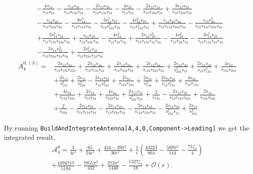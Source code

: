 \begin{align}
  & - \frac{4s_{14}}{s_{13}s_{24}} - \frac{s_{14}s_{23}}{s_{13}s_{134}s_{24}} - \frac{2s_{12}s_{23}}{s_{13}s_{134}s_{24}} - \frac{4s_{23}}{s_{13}s_{24}} - \frac{2s_{12}s_{14}}{s_{13}s_{234}s_{24}} + \frac{3s_{12}s_{23}}{s_{13}s_{234}s_{24}} \nonumber \\
  & - \frac{s_{14}s_{23}}{s_{13}s_{234}s_{24}} - \frac{8s_{14}^2}{s_{13}s_{134}s_{34}} - \frac{3s_{14}^2s_{23}}{s_{13}s_{134}^2s_{34}} - \frac{4s_{14}^2s_{24}}{s_{13}s_{134}^2s_{34}} + \frac{s_{14}s_{23}s_{24}}{s_{13}s_{134}s_{234}s_{34}} - \frac{s_{14}s_{23}^2}{s_{13}s_{134}s_{234}s_{34}} \nonumber \\
  & + \frac{2s_{14}^2s_{23}}{s_{13}s_{134}s_{234}s_{34}} + \frac{s_{14}s_{23}}{s_{13}s_{234}s_{34}} - \frac{4s_{14}^2}{s_{13}s_{24}s_{34}} + \frac{2s_{14}s_{23}^2}{s_{13}s_{134}s_{24}s_{34}} - \frac{4s_{23}^2}{s_{13}s_{24}s_{34}} - \frac{3s_{14}^2s_{23}}{s_{13}s_{134}s_{24}s_{34}} \nonumber \\
  & - \frac{3s_{14}s_{23}^2}{s_{13}s_{234}s_{24}s_{34}} + \frac{2s_{14}^2s_{23}}{s_{13}s_{234}s_{24}s_{34}}
\end{align}
\begin{align}
    A_4^{0,(3)} = {}
          & \frac{2s_{12}s_{34}}{s_{13}s_{134}s_{234}} + \frac{2s_{12}s_{34}}{s_{13}s_{134}s_{24}} + \frac{2s_{12}s_{34}}{s_{13}s_{234}s_{24}} + \frac{2s_{12}s_{34}}{s_{134}s_{234}s_{24}} + \frac{2s_{12}s_{34}}{s_{234}^2s_{24}} + \frac{2s_{12}s_{34}}{s_{13}s_{134}^2} + \frac{4s_{12}}{s_{134}s_{234}} \nonumber \\
  & + \frac{2s_{12}}{s_{134}^2} + \frac{2s_{12}}{s_{234}^2} - \frac{2s_{14}s_{23}}{s_{13}s_{134}^2} + \frac{2s_{24}}{s_{134}s_{234}} + \frac{2s_{24}}{s_{134}^2} + \frac{2s_{24}s_{34}}{s_{13}s_{134}^2} + \frac{4s_{34}}{s_{13}s_{134}} \nonumber \\
  & + \frac{4s_{34}}{s_{134}s_{234}} + \frac{2s_{34}}{s_{13}s_{24}} + \frac{4s_{34}}{s_{234}s_{24}} + \frac{2s_{13}s_{34}}{s_{234}^2s_{24}} + \frac{2}{s_{134}} - \frac{2s_{14}s_{23}}{s_{13}s_{134}s_{234}} + \frac{2s_{13}}{s_{134}s_{234}} \nonumber \\
  & + \frac{2}{s_{234}} - \frac{2s_{14}s_{23}}{s_{13}s_{134}s_{24}} - \frac{2s_{14}s_{23}}{s_{13}s_{234}s_{24}} - \frac{2s_{14}s_{23}}{s_{134}s_{234}s_{24}} - \frac{2s_{14}s_{23}}{s_{234}^2s_{24}} + \frac{2s_{13}}{s_{234}^2}.
\end{align}

By running \texttt{BuildAndIntegrateAntenna[A,4,0,Component->Leading]} we get the integrated result, 
\begin{equation}
    \begin{gathered}
        \mathcal A_4^0 = \frac3{4\epsilon^4}+\frac{65}{24\epsilon^3}+\frac{434-39\pi^2}{36\epsilon^2}+\frac1\epsilon\!\left(\frac{43223}{864}-\frac{589\pi^2}{144}-\frac{71\zeta_3}{4}\right)\\ 
        +\frac{1076717}{5184}-\frac{7955\pi^2}{432}+\frac{373\pi^4}{1440}-\frac{1327\zeta_3}{18} + \mathcal O\!\left(\epsilon\right).
    \end{gathered}
\end{equation}

